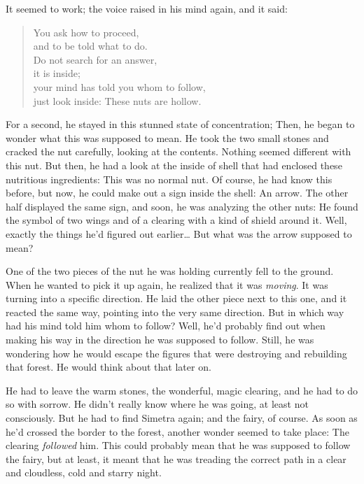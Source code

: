 It seemed to work; the voice raised in his mind again, and it said: 
\begin{verse}
You ask how to proceed,\\
and to be told what to do.\\
Do not search for an answer,\\
it is inside;\\
your mind has told you whom to follow,\\
just look inside: These nuts are hollow.
\end{verse}
For a second, he stayed in this stunned state of concentration; Then, he began to wonder what this was supposed to mean. He took the two small stones and cracked the nut carefully, looking at the contents. Nothing seemed different with this nut. But then, he had a look at the inside of shell that had enclosed these nutritious ingredients: This was no normal nut.
Of course, he had know this before, but now, he could make out a sign inside the shell: An arrow. The other half displayed the same sign, and soon, he was analyzing the other nuts: He found the symbol of two wings and of a clearing with a kind of shield around it. Well, exactly the things he'd figured out earlier\dots
But what was the arrow supposed to mean? 

One of the two pieces of the nut he was holding currently fell to the ground. When he wanted to pick it up again, he realized that it was \emph{moving}. It was turning into a specific direction. He laid the other piece next to this one, and it reacted the same way, pointing into the very same direction. But in which way had his mind told him whom to follow? 
Well, he'd probably find out when making his way in the direction he was supposed to follow. Still, he was wondering how he would escape the figures that were destroying and rebuilding that forest. He would think about that later on.

He had to leave the warm stones, the wonderful, magic clearing, and he had to do so with sorrow. He didn't really know where he was going, at least not consciously. But he had to find Simetra again; and the fairy, of course. 
As soon as he'd crossed the border to the forest, another wonder seemed to take place: The clearing \emph{followed} him. This could probably mean that he was supposed to follow the fairy, but at least, it meant that he was treading the correct path in a clear and cloudless, cold and starry night. 

